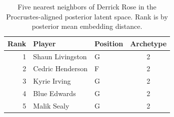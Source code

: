 \begin{table}[htbp]
  \centering\small
  \begin{tabular}{rllc}
    \toprule
    Rank & Player & Position & Archetype \\
    \midrule
    1 & Shaun Livingston & G & 2 \\
    2 & Cedric Henderson & F & 2 \\
    3 & Kyrie Irving & G & 2 \\
    4 & Blue Edwards & G & 2 \\
    5 & Malik Sealy & G & 2 \\
    \bottomrule
  \end{tabular}
  \caption{Five nearest neighbors of Derrick Rose in the Procrustes-aligned posterior latent space. Rank is by posterior mean embedding distance.}
  \label{tab:Derrick_Rose_neighbors}
\end{table}

